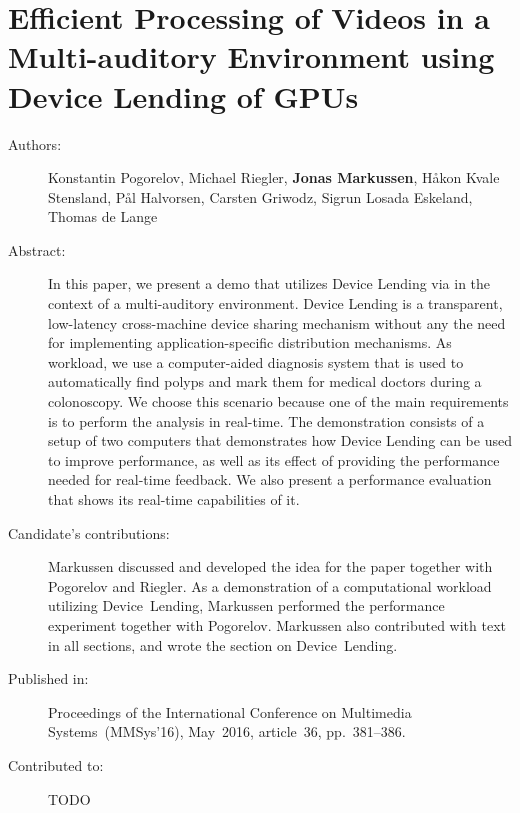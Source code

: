 \chapter{Efficient Processing of Videos in a Multi-auditory Environment using Device Lending of GPUs}
\label{paper:MMSys-2016}
\paperthumb

\begin{description}
	\item[Authors:]
	Konstantin Pogorelov, Michael Riegler, \textbf{Jonas Markussen}, H{\aa}kon Kvale Stensland,
	P{\aa}l Halvorsen, Carsten Griwodz, Sigrun Losada Eskeland, Thomas de Lange


	\item[Abstract:]
		In this paper, we present a demo that utilizes Device Lending 
		via  in the context of a multi-auditory
		environment. Device Lending is a transparent, low-latency
		cross-machine  device sharing mechanism without any
		the need for implementing application-specific distribution
		mechanisms. As workload, we use a computer-aided diagnosis 
		system that is used to automatically find polyps and
		mark them for medical doctors during a colonoscopy. We
		choose this scenario because one of the main requirements
		is to perform the analysis in real-time. The demonstration
		consists of a setup of two computers that demonstrates how
		Device Lending can be used to improve performance, as well
		as its effect of providing the performance needed for 
		real-time feedback. We also present a performance evaluation
		that shows its real-time capabilities of it.


	\item[Candidate's contributions:]
		Markussen discussed and developed the idea for the paper together with Pogorelov and Riegler.
		As a demonstration of a computational workload utilizing Device~Lending,
		Markussen performed the performance experiment together with Pogorelov.
		Markussen also contributed with text in all sections, and wrote the section on Device~Lending.

	\item[Published in:]
	Proceedings of the International Conference on Multimedia Systems~(MMSys'16),
	May~2016, article~36, pp.~381--386.

	\item[Contributed to:]
		TODO

\end{description}
